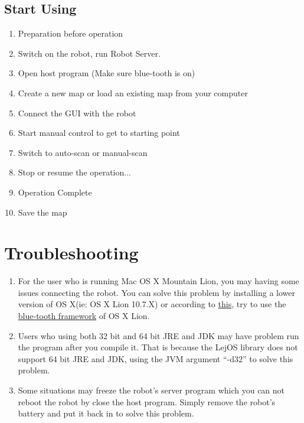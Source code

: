 \documentclass[11pt, a4paper]{report}
\begin{document}
\section{Start Using}
\begin{enumerate}

	\item Preparation before operation
	\item Switch on the robot, run Robot Server.
	\item Open host program (Make sure blue-tooth is on)
	\item Create a new map or load an existing map from your computer
	\item Connect the GUI with the robot
	\item Start manual control to get to starting point
	\item Switch to auto-scan or manual-scan
	\item Stop or resume the operation...
	\item Operation Complete
	\item Save the map
\end{enumerate}



\pagebreak
 

\chapter{Troubleshooting} %

\begin{enumerate}
	\item  For the user who is running Mac OS X Mountain Lion, you may having some issues connecting the robot. You can solve this problem by installing a lower version of OS X(ie: OS X Lion 10.7.X) or according to \href{https://groups.google.com/forum/?fromgroups=#!topic/bluecove-users/7jWv1V1GC-4}{this}, try to use the \href{https://bluecove-users.googlegroups.com/attach/8c4cbcadb7aa9e5/IOBluetooth-Lion.tgz?pli=1&view=1&part=4}{blue-tooth framework} of OS X Lion. 

	\item Users who using both 32 bit and 64 bit JRE and JDK may have problem run the program after you compile it. That is because the LejOS library does not support 64 bit JRE and JDK, using the JVM argument ``-d32'' to solve this problem.

	\item Some situations may freeze the robot's server program which you can not reboot the robot by close the host program. Simply remove the robot's battery and put it back in to solve this problem.

\end{enumerate}
\end{document}
